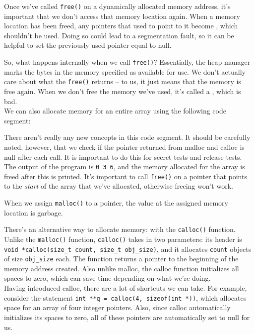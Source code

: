 Once we've called \verb!free()! on a dynamically allocated memory address, it's important that we don't access that memory location again. When a memory location has been freed, any pointers that used to point to it become , which shouldn't be used. Doing so could lead to a segmentation fault, so it can be helpful to set the previously used pointer equal to null.


So, what happens internally when we call \verb!free()!? Essentially, the heap manager marks the bytes in the memory specified as available for use. We don't actually care about what the \verb!free()! returns -- to us, it just means that the memory is free again. When we don't free the memory we've used, it's called a , which is bad. \\


We can also allocate memory for an entire array using the following code segment:



\begin{center}

\end{center}

There aren't really any new concepts in this code segment. It should be carefully noted, however, that we check if the pointer returned from malloc and calloc is null after each call. It is important to do this for secret tests and release tests. The output of the program is \texttt{0 3 6}, and the memory allocated for the array is freed after this is printed. It's important to call \verb!free()! on a pointer that points to the \textit{start} of the array that we've allocated, otherwise freeing won't work.



When we assign \verb!malloc()! to a pointer, the value at the assigned memory location is garbage. 




There's an alternative way to allocate memory: with the \verb!calloc()! function. Unlike the \verb!malloc()! function, \verb!calloc()! takes in two parameters: its header is \verb!void *calloc(size_t count, size_t obj_size)!, and it allocates \verb!count! objects of size \verb!obj_size! each. The function returns a pointer to the beginning of the memory address created. Also unlike malloc, the calloc function initializes all spaces to zero, which can save time depending on what we're doing. \\



Having introduced calloc, there are a lot of shortcuts we can take. For example, consider the statement \verb!int **q = calloc(4, sizeof(int *))!, which allocates space for an array of four integer pointers. Also, since calloc automatically initializes its spaces to zero, all of these pointers are automatically set to null for us. 